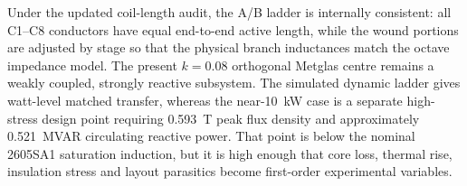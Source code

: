 Under the updated coil-length audit, the A/B ladder is internally consistent:
all C1--C8 conductors have equal end-to-end active length, while the wound
portions are adjusted by stage so that the physical branch inductances match
the octave impedance model. The present \(k=0.08\) orthogonal Metglas centre
remains a weakly coupled, strongly reactive subsystem. The simulated dynamic
ladder gives watt-level matched transfer, whereas the near-\SI{10}{\kilo\watt}
case is a separate high-stress design point requiring
\SI{0.593}{\tesla} peak flux density and approximately
\SI{0.521}{MVAR} circulating reactive power. That point is below the
nominal 2605SA1 saturation induction, but it is high enough that core loss,
thermal rise, insulation stress and layout parasitics become first-order
experimental variables.
